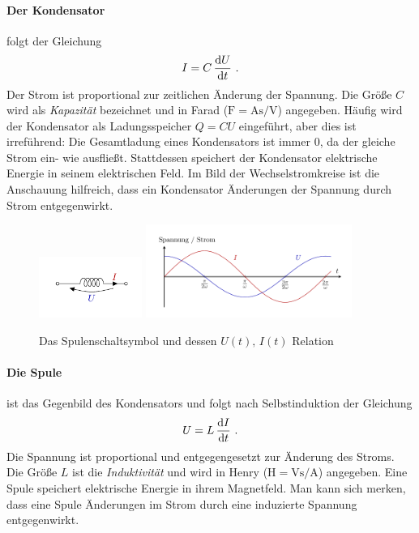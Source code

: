 \paragraph*{Der Kondensator}
folgt der Gleichung
\begin{equation}\label{eq:C}
    I = C\,\dv{U}{t} ~.
\end{equation}
Der Strom ist proportional zur zeitlichen Änderung der Spannung. Die Größe $C$ wird als \emph{Kapazität} bezeichnet und
in Farad ($\si{\farad} = \si{\ampere\second}/\si{\volt}$) angegeben. Häufig wird der Kondensator als Ladungsspeicher $Q
= CU$ eingeführt, aber dies ist irreführend: Die Gesamtladung eines Kondensators ist immer 0, da der gleiche Strom ein-
wie ausfließt. Stattdessen speichert der Kondensator elektrische Energie in seinem elektrischen Feld. Im Bild der
Wechselstromkreise ist die Anschauung hilfreich, dass ein Kondensator Änderungen der Spannung durch Strom entgegenwirkt.
\begin{figure}[h!]
    \centering
    \includegraphics[width=0.3\textwidth]{kBL.pdf}
    \includegraphics[width=0.6\textwidth]{kPL.pdf}
    \caption{Das Spulenschaltsymbol und dessen $U(t),\, I(t)$ Relation}
\end{figure}
\paragraph*{Die Spule}
ist das Gegenbild des Kondensators und folgt nach Selbstinduktion der Gleichung
\begin{equation}\label{eq:L}
    U = L\,\dv{I}{t} ~.
\end{equation}
Die Spannung ist proportional und entgegengesetzt zur Änderung des Stroms. Die Größe $L$ ist die \emph{Induktivität} und
wird in Henry ($\si{\henry} = \si{\volt\second}/\si{\ampere}$) angegeben. Eine Spule speichert elektrische Energie in
ihrem Magnetfeld. Man kann sich merken, dass eine Spule Änderungen im Strom durch eine induzierte Spannung
entgegenwirkt.
